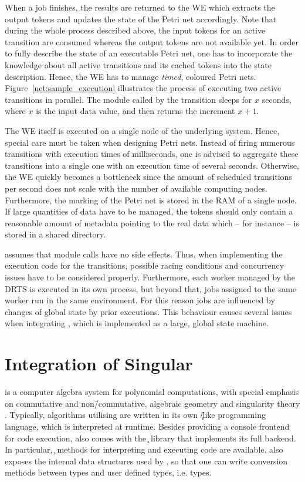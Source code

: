When a job finishes, the results are returned to the \ac{WE} which extracts the output tokens and updates the state of the Petri net accordingly. Note that during the whole process described above, the input tokens for an active transition are consumed whereas the output tokens are not available yet. In order to fully describe the state of an executable Petri net, one has to incorporate the knowledge about all active transitions and its cached tokens into the state description. Hence, the \ac{WE} has to manage \emph{timed}, coloured Petri nets. Figure~\ref{net:sample_execution} illustrates the process of executing two active transitions in parallel. The module called by the transition sleeps for $x$ seconds, where $x$ is the input data value, and then returns the increment $x + 1$.



The \ac{WE} itself is executed on a single node of the underlying system. Hence, special care must be taken when designing Petri nets. Instead of firing numerous transitions with execution times of milliseconds, one is advised to aggregate these transitions into a single one with an execution time of several seconds. Otherwise, the \ac{WE} quickly becomes a bottleneck since the amount of scheduled transitions per second does not scale with the number of available computing nodes. Furthermore, the marking of the Petri net is stored in the RAM of a single node. If large quantities of data have to be managed, the tokens should only contain a reasonable amount of metadata pointing to the real data which -- for instance -- is stored in a shared directory.

\gpispace{} assumes that module calls have no side effects. Thus, when implementing the execution code for the transitions, possible racing conditions and concurrency issues have to be considered properly. Furthermore, each worker managed by the \ac{DRTS} is executed in its own process, but beyond that, jobs assigned to the same worker run in the same environment. For this reason jobs are influenced by changes of global state by prior executions. This behaviour causes several issues when integrating \singular{}, which is implemented as a large, global state machine.

\section{Integration of Singular}
\singular{} is a computer algebra system for polynomial computations, with special emphasis on commutative and non\=/commutative, algebraic geometry and singularity theory \cite{singular}. Typically, algorithms utilising \singular{} are written in its own \c\=/like programming language, which is interpreted at runtime. Besides providing a console frontend for code execution, \singular{} also comes with the \c{} library \libsingular{} that implements its full backend. In particular, \c{} methods for interpreting and executing \singular{} code are available. \libsingular{} also exposes the internal data structures used by \singular{}, so that one can write conversion methods between \singular{} types and user defined types, i.e. \gpispace{} types.

